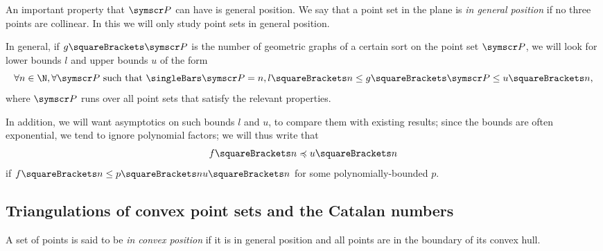 \documentclass[10pt, a4paper, twoside]{basestyle}
\newcommand{\pointset}{\symscr}
\begin{document}
An important property that $\pointset P$ can have is general position. We say that 
a point set in the plane is \emph{in general position} if no three points are collinear.
In this we will only study point sets in general position.

In general, if $g\of {\pointset P}$ is the number of geometric graphs of a certain sort on the point
set $\pointset P$, we will look for lower bounds $l$ and upper bounds $u$ of the form\[
\forall n\in \N, \forall \pointset P \text{ such that } \Cardinality {\pointset P} = n,
l \of n \leq g \of {\pointset P} \leq u \of n \text,\]
where $\pointset P$ runs over all point sets that satisfy the relevant properties.

In addition, we will want asymptotics on such bounds $l$ and $u$, to compare them with
existing results; since the bounds are often exponential, we tend to ignore polynomial
factors; we will thus write that\[
f \of n \preccurlyeq u \of n
\]
if $f\of n \leq p\of n u \of n$ for some polynomially-bounded $p$.
\subsection{Triangulations of convex point sets and the Catalan numbers}
A set of points is said to be \emph{in convex position} if it is in general position and
all points are in the boundary of its convex hull.
\end{document}
